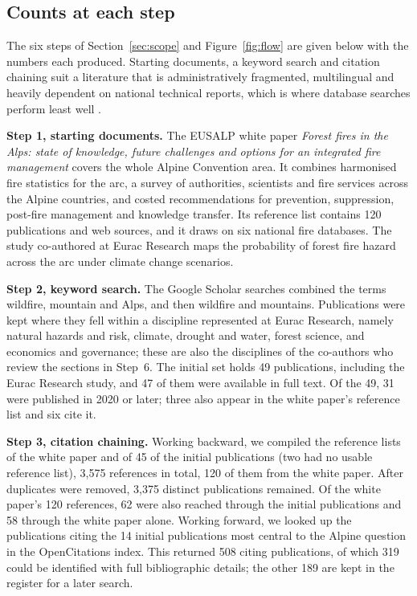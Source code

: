 \documentclass[11pt,a4paper]{article}
\begin{document}
\subsection{Counts at each step}

The six steps of Section~\ref{sec:scope} and Figure~\ref{fig:flow} are given below with the numbers each produced. Starting documents, a keyword search and citation chaining suit a literature that is administratively fragmented, multilingual and heavily dependent on national technical reports, which is where database searches perform least well \citep{mantero_influence_2020}.

\textbf{Step 1, starting documents.} The EUSALP white paper \emph{Forest fires in the Alps: state of knowledge, future challenges and options for an integrated fire management} \citep{muller_forest_2020} covers the whole Alpine Convention area. It combines harmonised fire statistics for the arc, a survey of authorities, scientists and fire services across the Alpine countries, and costed recommendations for prevention, suppression, post-fire management and knowledge transfer. Its reference list contains 120 publications and web sources, and it draws on six national fire databases. The study co-authored at Eurac Research \citep{gerberding_mapping_2025} maps the probability of forest fire hazard across the arc under climate change scenarios.

\textbf{Step 2, keyword search.} The Google Scholar searches combined the terms wildfire, mountain and Alps, and then wildfire and mountains. Publications were kept where they fell within a discipline represented at Eurac Research, namely natural hazards and risk, climate, drought and water, forest science, and economics and governance; these are also the disciplines of the co-authors who review the sections in Step~6. The initial set holds 49 publications, including the Eurac Research study, and 47 of them were available in full text. Of the 49, 31 were published in 2020 or later; three also appear in the white paper's reference list and six cite it.

\textbf{Step 3, citation chaining.} Working backward, we compiled the reference lists of the white paper and of 45 of the initial publications (two had no usable reference list), 3{,}575 references in total, 120 of them from the white paper. After duplicates were removed, 3{,}375 distinct publications remained. Of the white paper's 120 references, 62 were also reached through the initial publications and 58 through the white paper alone. Working forward, we looked up the publications citing the 14 initial publications most central to the Alpine question in the OpenCitations index. This returned 508 citing publications, of which 319 could be identified with full bibliographic details; the other 189 are kept in the register for a later search.
\end{document}
